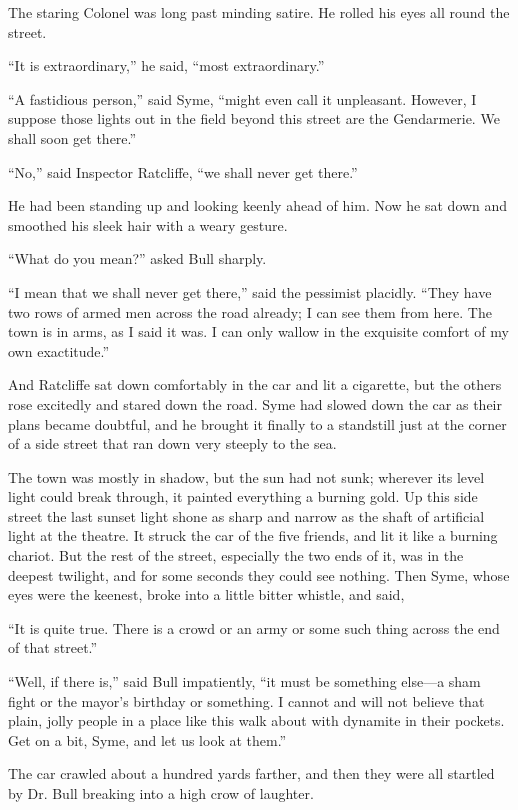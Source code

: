 The staring Colonel was long past minding satire. He rolled his eyes all round the street.

“It is extraordinary,” he said, “most extraordinary.”

“A fastidious person,” said Syme, “might even call it unpleasant. However, I suppose those lights out in the field beyond this street are the Gendarmerie. We shall soon get there.”

“No,” said Inspector Ratcliffe, “we shall never get there.”

He had been standing up and looking keenly ahead of him. Now he sat down and smoothed his sleek hair with a weary gesture.

“What do you mean?” asked Bull sharply.

“I mean that we shall never get there,” said the pessimist placidly. “They have two rows of armed men across the road already; I can see them from here. The town is in arms, as I said it was. I can only wallow in the exquisite comfort of my own exactitude.”

And Ratcliffe sat down comfortably in the car and lit a cigarette, but the others rose excitedly and stared down the road. Syme had slowed down the car as their plans became doubtful, and he brought it finally to a standstill just at the corner of a side street that ran down very steeply to the sea.

The town was mostly in shadow, but the sun had not sunk; wherever its level light could break through, it painted everything a burning gold. Up this side street the last sunset light shone as sharp and narrow as the shaft of artificial light at the theatre. It struck the car of the five friends, and lit it like a burning chariot. But the rest of the street, especially the two ends of it, was in the deepest twilight, and for some seconds they could see nothing. Then Syme, whose eyes were the keenest, broke into a little bitter whistle, and said,

“It is quite true. There is a crowd or an army or some such thing across the end of that street.”

“Well, if there is,” said Bull impatiently, “it must be something else⁠—a sham fight or the mayor’s birthday or something. I cannot and will not believe that plain, jolly people in a place like this walk about with dynamite in their pockets. Get on a bit, Syme, and let us look at them.”

The car crawled about a hundred yards farther, and then they were all startled by Dr. Bull breaking into a high crow of laughter.


